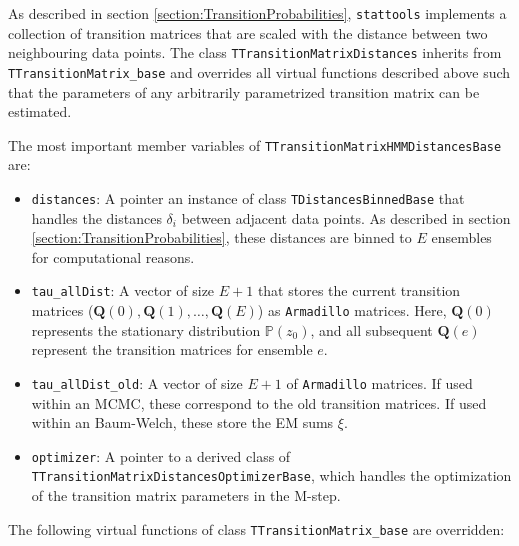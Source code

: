 \documentclass[a4paper,11pt]{article}
\def\Q{\boldsymbol{Q}}
\def\p{\mathbb{P}}
\def\stattools{\texttt{stattools}}
\def\armadillo{\texttt{Armadillo}}
\newcommand{\class}[1]{\texttt{#1}}
\newcommand{\privparam}[1]{\texttt{\textunderscore #1}}
\begin{document}
As described in section \ref{section:TransitionProbabilities}, \stattools{} implements a collection of transition matrices that are scaled with the distance between two neighbouring data points. The class \class{TTransitionMatrixDistances} inherits from \class{TTransitionMatrix\_base} and overrides all virtual functions described above such that the parameters of any arbitrarily parametrized transition matrix can be estimated.

The most important member variables of \class{TTransitionMatrixHMMDistancesBase} are:
\begin{itemize}
 \item \privparam{distances}: A pointer an instance of class \class{TDistancesBinnedBase} that handles the distances $\delta_i$ between adjacent data points. As described in section  \ref{section:TransitionProbabilities}, these distances are binned to $E$ ensembles for computational reasons.

 \item \privparam{tau\_allDist}: A vector of size $E+1$ that stores the current transition matrices ($\Q(0), \Q(1), \ldots, \Q(E)$) as \armadillo{} matrices. Here, $\Q(0)$ represents the stationary distribution $\p(z_0)$, and all subsequent $\Q(e)$ represent the transition matrices for ensemble $e$.

 \item \privparam{tau\_allDist\_old}: A vector of size $E+1$ of \armadillo{} matrices. If used within an MCMC, these correspond to the old transition matrices. If used within an Baum-Welch, these store the EM sums $\xi$.

 \item \privparam{optimizer}: A pointer to a derived class of \class{TTransitionMatrixDistancesOptimizerBase}, which handles the optimization of the transition matrix parameters in the M-step.
\end{itemize}

The following virtual functions of class \class{TTransitionMatrix\_base} are overridden:
\end{document}
